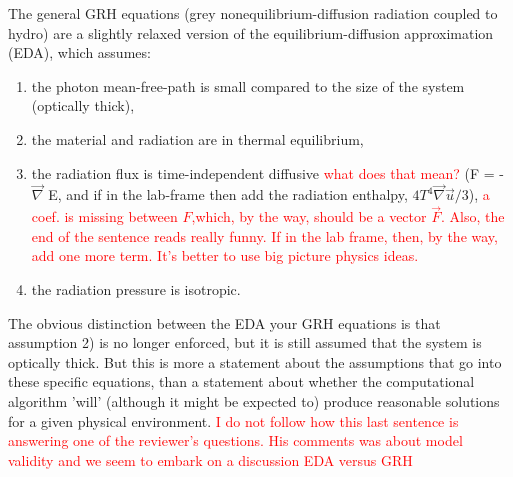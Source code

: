 \documentclass{article}
\newcommand{\grad}{\vec{\nabla}}
\newcommand{\tcr}[1]{\textcolor{red}{#1}}
\begin{document}
The general GRH equations (grey nonequilibrium-diffusion radiation coupled to hydro) are a slightly relaxed version of the equilibrium-diffusion approximation (EDA), which assumes:
\begin{enumerate}
\item the photon mean-free-path is small compared to the size of the system (optically thick),
\item the material and radiation are in thermal equilibrium,
\item the radiation flux is time-independent diffusive \tcr{what does that mean?} (F = - $\grad$ E, and if in the lab-frame then add the radiation enthalpy, $4T^4\grad \vec{u} / 3$), \tcr{a coef. is missing between $F$,which, by the way, should be a vector $\vec{F}$. Also, the end of the sentence reads really funny. If in the lab frame, then, by the way, add one more term. It's better to use big picture physics ideas.}
\item the radiation pressure is isotropic.
\end{enumerate}
The obvious distinction between the EDA your GRH equations is that assumption 2) is no longer enforced, but it is still assumed that the system is optically thick.  But this is more a statement about the assumptions that go into these specific equations, than a statement about whether the computational algorithm 'will' (although it might be expected to) produce reasonable solutions for a given physical environment. \tcr{I do not follow how this last sentence is answering one of the reviewer's questions. His comments was about model validity and we seem to embark on a discussion EDA versus GRH} 


\end{document}
